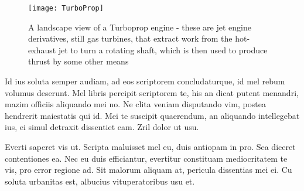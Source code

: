 \begin{landscape}
  \begin{figure}[hbt]
    \begin{center}
      \texttt{[image: TurboProp]}
    \end{center}
    \vspace{0.10in}
    \caption{A landscape view of a Turboprop engine - these are 
      jet engine derivatives, still gas turbines, that extract 
      work from the hot-exhaust jet to turn a rotating shaft, 
      which is then used to produce thrust by some other means}
    \label{CHAPTER3_FIG03}
  \end{figure}
\end{landscape}

Id ius soluta semper audiam, ad eos scriptorem concludaturque, id mel rebum 
volumus deserunt. Mel libris percipit scriptorem te, his an dicat putent 
menandri, mazim officiis aliquando mei no. Ne clita veniam disputando vim, 
postea hendrerit maiestatis qui id. Mei te suscipit quaerendum, an aliquando 
intellegebat ius, ei simul detraxit dissentiet eam. Zril dolor ut usu.

Everti saperet vis ut. Scripta maluisset mel eu, duis antiopam in pro. Sea 
diceret contentiones ea. Nec eu duis efficiantur, evertitur constituam 
mediocritatem te vis, pro error regione ad. Sit malorum aliquam at, pericula 
dissentias mei ei. Cu soluta urbanitas est, albucius vituperatoribus usu et.
